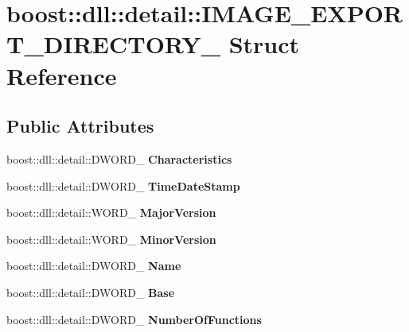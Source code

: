 \hypertarget{a00146}{}\section{boost\+:\+:dll\+:\+:detail\+:\+:I\+M\+A\+G\+E\+\_\+\+E\+X\+P\+O\+R\+T\+\_\+\+D\+I\+R\+E\+C\+T\+O\+R\+Y\+\_\+ Struct Reference}
\label{a00146}
\subsection*{Public Attributes}
\begin{DoxyCompactItemize}
\item 
boost\+::dll\+::detail\+::\+D\+W\+O\+R\+D\+\_\+ {\bfseries Characteristics}\hypertarget{a00146_a9e38ab93cca0b67f8e2442732422e6d2}{}\label{a00146_a9e38ab93cca0b67f8e2442732422e6d2}

\item 
boost\+::dll\+::detail\+::\+D\+W\+O\+R\+D\+\_\+ {\bfseries Time\+Date\+Stamp}\hypertarget{a00146_a739de9030de675c85bfeb2a5d3d5be67}{}\label{a00146_a739de9030de675c85bfeb2a5d3d5be67}

\item 
boost\+::dll\+::detail\+::\+W\+O\+R\+D\+\_\+ {\bfseries Major\+Version}\hypertarget{a00146_a039cfd06d5bb240d9f61dc92eb41f53e}{}\label{a00146_a039cfd06d5bb240d9f61dc92eb41f53e}

\item 
boost\+::dll\+::detail\+::\+W\+O\+R\+D\+\_\+ {\bfseries Minor\+Version}\hypertarget{a00146_a9bba569a6e4fc6ee2f92594cb8b6487f}{}\label{a00146_a9bba569a6e4fc6ee2f92594cb8b6487f}

\item 
boost\+::dll\+::detail\+::\+D\+W\+O\+R\+D\+\_\+ {\bfseries Name}\hypertarget{a00146_ab8e041ceece18fa6e0589eb33d480629}{}\label{a00146_ab8e041ceece18fa6e0589eb33d480629}

\item 
boost\+::dll\+::detail\+::\+D\+W\+O\+R\+D\+\_\+ {\bfseries Base}\hypertarget{a00146_aec005afc52afc2fab10a60f219a35afc}{}\label{a00146_aec005afc52afc2fab10a60f219a35afc}

\item 
boost\+::dll\+::detail\+::\+D\+W\+O\+R\+D\+\_\+ {\bfseries Number\+Of\+Functions}\hypertarget{a00146_a7d1acd283af07c583f71f6a5405470fb}{}\label{a00146_a7d1acd283af07c583f71f6a5405470fb}


\end{DoxyCompactItemize}
